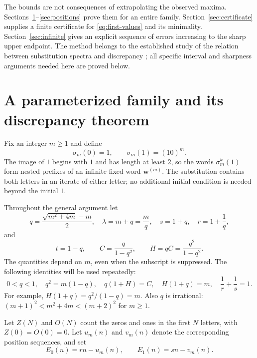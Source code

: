 \documentclass[11pt]{article}
\numberwithin{equation}{section}
\theoremstyle{definition}
\theoremstyle{remark}
\newcommand{\word}{\mathbf{w}}
\begin{document}
The bounds are not consequences of extrapolating the observed maxima.
Sections~\ref{sec:family}--\ref{sec:positions} prove them for an entire
family. Section~\ref{sec:certificate} supplies a finite certificate for
\eqref{eq:first-values} and its minimality. Section~\ref{sec:infinite}
gives an explicit sequence of errors increasing to the sharp upper
endpoint. The method belongs to the established study of the relation
between substitution spectra and discrepancy \cite{adamczewski}; all
specific interval and sharpness arguments needed here are proved below.

\section{A parameterized family and its discrepancy theorem}\label{sec:family}

Fix an integer $m\ge1$ and define
\begin{equation}\label{eq:family-sub}
\sigma_m(0)=1,\qquad \sigma_m(1)=(10)^m.
\end{equation}
The image of $1$ begins with $1$ and has length at least $2$, so the words
$\sigma_m^k(1)$ form nested prefixes of an infinite fixed word
$\word^{(m)}$. The substitution contains both letters in an iterate of
either letter; no additional initial condition is needed beyond the
initial $1$.

Throughout the general argument let
\begin{equation}\label{eq:parameters}
q=\frac{\sqrt{m^2+4m}-m}{2},\quad
\lambda=m+q=\frac mq,\quad
s=1+q,\quad r=1+\frac1q,
\end{equation}
and
\begin{equation}\label{eq:CH}
t=1-q,\qquad C=\frac{q}{1-q^2},\qquad
H=qC=\frac{q^2}{1-q^2}.
\end{equation}
The quantities depend on $m$, even when the subscript is suppressed.
The following identities will be used repeatedly:
\begin{equation}\label{eq:identities}
0<q<1,\quad q^2=m(1-q),\quad
q(1+H)=C,\quad H(1+q)=m,\quad
\frac1r+\frac1s=1.
\end{equation}
For example, $H(1+q)=q^2/(1-q)=m$. Also $q$ is irrational:
$(m+1)^2<m^2+4m<(m+2)^2$ for $m\ge1$.

Let $Z(N)$ and $O(N)$ count the zeros and ones in the first $N$ letters,
with $Z(0)=O(0)=0$. Let $u_m(n)$ and $v_m(n)$ denote the corresponding
position sequences, and set
\[
E_0(n)=rn-u_m(n),\qquad E_1(n)=sn-v_m(n).
\]
\end{document}

